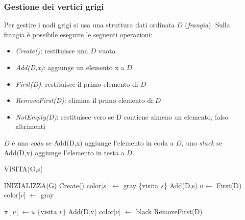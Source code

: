 \documentclass[11pt]{book}
\begin{document}
\subsubsection{Gestione dei vertici grigi}
Per gestire i nodi grigi si usa una struttura dati ordinata $D$ (\textit{frangia}). Sulla frangia è possibile eseguire le 
seguenti operazioni:
\begin{itemize}
    \item \textit{Create()}: restituisce una $D$ vuota
    \item \textit{Add(D,x)}: aggiunge un elemento x a $D$
    \item \textit{First(D)}: restituisce il primo elemento di $D$
    \item \textit{RemoveFirst(D)}: elimina il primo elemento di $D$
    \item \textit{NotEmpty(D)}: restituisce vero se D contiene almeno un elemento, falso altrimenti
\end{itemize}
$D$ è una \textit{coda} se Add(D,x) aggiunge l'elemento in coda a $D$, uno \textit{stack} se Add(D,x) aggiunge l'elemento 
in testa a $D$.
\begin{algorithm}[H]
    \caption{VISITA(G,s)}
    \begin{algorithmic}
        \State INIZIALIZZA(G)
        \State Create() 
        \State color[$s$] $\gets$ gray
        \State \{visita $s$\}
        \State Add(D,s)
        \State $u \gets$ First(D)
            \State color[$v$] $\gets$ gray
    \end{algorithmic}
\end{algorithm}
\begin{algorithm}[h]
    \begin{algorithmic}
            \State $\pi[v] \gets u$
            \State \{visita $v$\}
            \State Add(D,v)
        \Else
            \State color[$v$] $\gets$ black
            \State RemoveFirst(D)
        \EndIf
    \EndWhile
    \end{algorithmic}
\end{algorithm}
\end{document}
